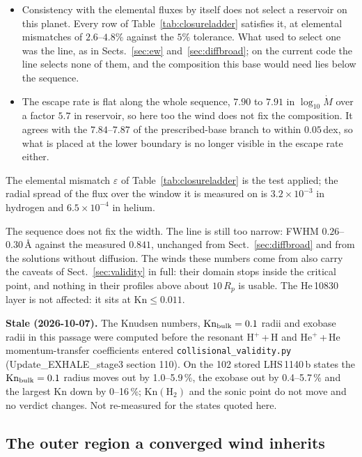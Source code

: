 \documentclass[english,a4paper]{my_memo}
\begin{document}
\begin{itemize}
\item Consistency with the elemental fluxes by itself does not select a
      reservoir on this planet. Every row of
      Table~\ref{tab:closureladder} satisfies it, at elemental mismatches of
      $2.6$--$4.8\%$ against the $5\%$ tolerance. What used to select one was
      the line, as in Sects.~\ref{sec:ew} and~\ref{sec:diffbroad}; on the
      current code the line selects none of them, and the composition this
      base would need lies below the sequence.
\item The escape rate is flat along the whole sequence, $7.90$ to $7.91$ in
      $\log_{10}\dot M$ over a factor $5.7$ in reservoir, so here too the
      wind does not fix the composition. It agrees with the $7.84$--$7.87$
      of the prescribed-base branch to within $0.05$\,dex, so what is placed
      at the lower boundary is no longer visible in the escape rate either.
\end{itemize}

The elemental mismatch $\varepsilon$ of Table~\ref{tab:closureladder} is the
test applied; the radial spread of the flux over the window it is measured on
is $3.2\times10^{-3}$ in hydrogen and $6.5\times10^{-4}$ in helium.

\medskip
\noindent The sequence does not fix the width. The line is still too narrow:
FWHM $0.26$--$0.30$\,\AA{} against the measured $0.841$, unchanged from
Sect.~\ref{sec:diffbroad} and from the solutions without diffusion. The winds
these numbers come from also carry the caveats of Sect.~\ref{sec:validity} in
full: their domain stops inside the critical point, and nothing in their
profiles above about $10\,R_p$ is usable. The He\,10830 layer is not
affected: it sits at $\mathrm{Kn} \le 0.011$.

\noindent\textbf{Stale (2026-10-07).} The Knudsen numbers, $\mathrm{Kn}_{\rm bulk}=0.1$ radii and exobase radii in this passage were computed before the resonant H$^+$\,+\,H and He$^+$\,+\,He momentum-transfer coefficients entered \texttt{collisional\_validity.py} (Update\_EXHALE\_stage3 section 110). On the 102 stored LHS\,1140\,b states the $\mathrm{Kn}_{\rm bulk}=0.1$ radius moves out by 1.0--5.9\,\%, the exobase out by 0.4--5.7\,\% and the largest Kn down by 0--16\,\%; $\mathrm{Kn}(\mathrm{H_2})$ and the sonic point do not move and no verdict changes. Not re-measured for the states quoted here.

\subsection{The outer region a converged wind inherits}
\label{sec:outerinherit}
\end{document}
